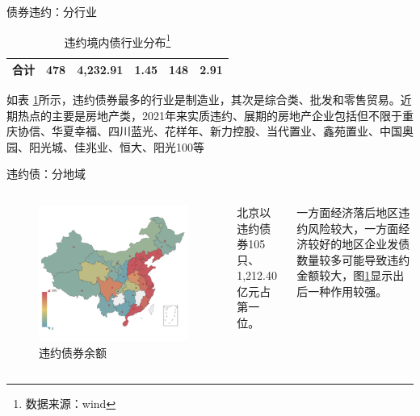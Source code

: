 \begin{frame}{债券违约：分行业}
\begin{table}[]
{\begin{tabular}{llllll}
				\textbf{合计}                     & \textbf{478}                              & \textbf{4,232.91}                               & \textbf{1.45}                               & \textbf{148}                                & \textbf{2.91}                                       \\ \hline
			\end{tabular}
		}
		\caption{违约境内债行业分布\footnote{数据来源：wind}}
		\label{fig:default_indus}
	\end{table}
	如表 \ref{fig:default_indus}所示，违约债券最多的行业是制造业，其次是综合类、批发和零售贸易。近期热点的主要是房地产类，2021年来实质违约、展期的房地产企业包括但不限于重庆协信、华夏幸福、四川蓝光、花样年、新力控股、当代置业、鑫苑置业、中国奥园、阳光城、佳兆业、恒大、阳光100等
\end{frame}

\begin{frame}{违约债：分地域}
	\begin{columns}
		\begin{figure}
			\centering
			\includegraphics[width=\linewidth]{lib/default_by_geo.png}
			\caption{违约债券余额}
			\label{fig:defaultGeo}
		\end{figure}
		北京以违约债券105只、1,212.40亿元占第一位。

		一方面经济落后地区违约风险较大，一方面经济较好的地区企业发债数量较多可能导致违约金额较大，图\ref{fig:defaultGeo}显示出后一种作用较强。
	\end{columns}
\end{frame}
